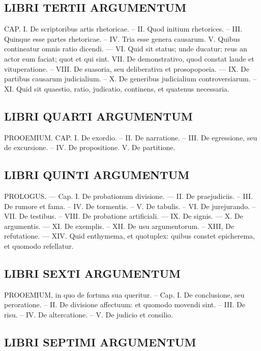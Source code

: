 \subsection*{LIBRI TERTII ARGUMENTUM}

CAP. I. De scriptoribus artis rhetoricae. – II. Quod initium rhetorices. – III. Quinque esse partes rhetoricae. – IV. Tria esse genera causarum. V. Quibus contineatur omnis ratio dicendi. — VI. Quid sit status; unde ducatur; reus an actor eum faciat; quot et qui sint. VII. De demonstrativo, quod constat laude et vituperatione. – VIII. De suasoria, seu deliberativa et prosopopoeia. — IX. De partibus causarum judicialium. – X. De generibus judicialium controversiarum. – XI. Quid sit quaestio, ratio, judicatio, continens, et quatenus necessaria.

\subsection*{LIBRI QUARTI ARGUMENTUM}

PROOEMIUM. CAP. I. De exordio. – II. De narratione. – III. De egressione, seu de excursione. – IV. De propositione. V. De partitione.

\subsection*{LIBRI QUINTI ARGUMENTUM}

PROLOGUS. — Cap. I. De probationum divisione. — II. De praejudiciis. – III. De rumore et fama. – IV. De tormentis. – V. De tabulis. – VI. De jurejurando. – VII. De testibus. – VIII. De probatione artificiali. — IX. De signis. — X. De argumentis. — XI. De exemplis. – XII. De usu argumentorum. – XIII, De refutatione. — XIV. Quid enthymema, et quotuplex: quibus constet epicherema, et quomodo refellatur.

\subsection*{LIBRI SEXTI ARGUMENTUM}

PROOEMIUM, in quo de fortuna sua queritur. – Cap. I. De conclusione, seu peroratione. – II. De divisione affectuum: et quomodo movendi sint. – III. De risu. – IV. De altercatione. – V. De judicio et consilio.

\subsection*{LIBRI SEPTIMI ARGUMENTUM}

